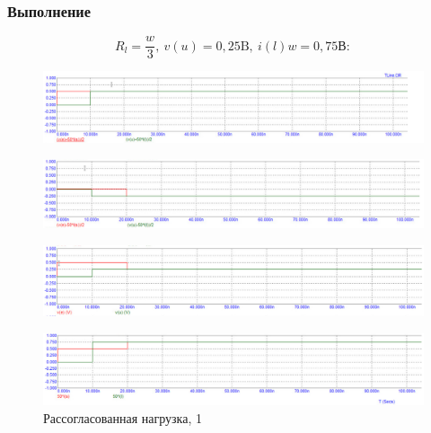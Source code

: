 \documentclass[a4paper, 14pt]{extarticle}%
\begin{document}
\subsubsection{Выполнение}

\[R_l =\frac{w}{3},\  v(u)=0,25 \text{B},\ i(l)w =0,75 \text{В} :\]

\begin{figure}[h!]
			\centering
			\includegraphics[width=1.1\linewidth]{./graphs/4.jpg}
			\label{3.1.1}
\end{figure}

\newpage

\begin{figure}[h!]
			\centering
			\includegraphics[width=1.1\linewidth]{./graphs/5.jpg}
			\label{3.1.2}
\end{figure}


\begin{figure}[h!]
			\centering
			\includegraphics[width=1.1\linewidth]{./graphs/6.jpg}
			\label{3.1.3}
\end{figure}


\begin{figure}[h!]
			\centering
			\includegraphics[width=1.1\linewidth]{./graphs/7.jpg}
			\caption{Рассогласованная нагрузка, 1}
			\label{3.1.4}
\end{figure}
\end{document}
